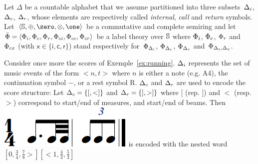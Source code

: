 \noindent
\label{sec:SWVPA-def}
Let $\Delta$ be a countable alphabet
that we assume partitioned into three
subsets~$\Deltai$, $\Deltac$, $\Deltar$,
whose elements are respectively called
\emph{internal}, \emph{call} and \emph{return} symbols.
Let~$\< \Semiring, \oplus, \zero, \otimes, \one>$ be a commutative and complete semiring and let
$\bar\Phi = \< \Phii, \Phic, \Phir, \Phici, \Phicc, \Phicr>$
be a label theory over $\mathbb{S}$
where $\Phii$, $\Phic$, $\Phir$ and~$\Phicx$ (with $\mathsf{x} \in \{ \mathsf{i}, \mathsf{c}, \mathsf{r}\}$)
stand respectively
for~$\Phi_\Deltai$, $\Phi_\Deltac$, $\Phi_\Deltar$ and~$\Phi_{\Deltac, \Delta_\mathsf{x}}$.
%

\begin{example}
Consider once more the scores of Exemple~\ref{ex:running}.
$\Deltai$ represents the set of music events of the form $<n, t>$
where $n$ is either a note (e.g. A4), the continuation symbol $-$, or a
rest symbol R. $\Deltac$ and  $\Deltar$ are used to encode the score structure:
Let $\Deltac = \{[, <]\}$ and  $\Deltar = \{], >]\}$ where $[$ (rep. $]$)
and $<$ (resp. $>$) correspond to start/end of measures, and start/end of
beams. Then  \includegraphics[scale=0.20]{pictures/score5.png}
is encoded with the nested word $[0, \frac{3}{4}, \frac{7}{8}>][<1, \frac{4}{3}, \frac{5}{3}]$
\endex
\end{example}


